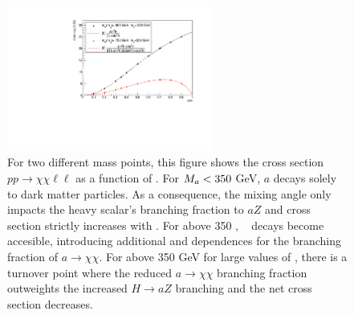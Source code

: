 \begin{figure}
\centering
\includegraphics[width=0.6\textwidth]{texinputs/04_grid/figures/monoz/leptonic/SinThetaScan_xsecs.pdf}
\caption{For two different mass points, this figure shows the cross section $pp\rightarrow\chi\chi\ell\ell$ as a function of \sinp. 
For $M_{a} < 350$ GeV, $a$ decays solely to dark matter particles.  
As a consequence, the mixing angle only impacts the heavy scalar's branching fraction to $aZ$ and 
cross section strictly increases with \sinp.  
For \ma above 350 \GeV, \ttbar~ decays become accesible, introducing additional \sinp and \cosp dependences for the branching fraction 
of $a\rightarrow\chi\chi$.  For \ma above 350 GeV for large values of \sinp, there is a turnover point where the reduced $a\rightarrow\chi\chi$ branching fraction outweights the increased $H \rightarrow aZ$ branching and the net cross section decreases.}
\label{fig:monoz_ll_sinp_scan_xsec}
\end{figure}

